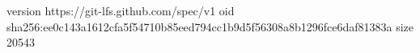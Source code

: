 version https://git-lfs.github.com/spec/v1
oid sha256:ee0c143a1612cfa5f54710b85eed794cc1b9d5f56308a8b1296fce6daf81383a
size 20543
